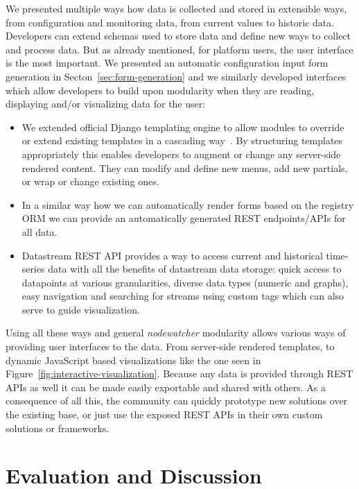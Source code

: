 \documentclass[5p,sort&compress]{elsarticle}
\newcommand{\nodewatcher}{\textit{nodewatcher}}
\begin{document}
We presented multiple ways how data is collected and stored in extensible ways, from configuration and monitoring data, from current values to historic data.
Developers can extend schemas used to store data and define new ways to collect and process data.
But as already mentioned, for platform users, the user interface is the most important.
We presented an automatic configuration input form generation in Secton~\ref{sec:form-generation} and we similarly developed interfaces which allow developers to build upon modularity when they are reading, displaying and/or visualizing data for the user:

\begin{itemize}
\item We extended official Django templating engine to allow modules to override or extend existing templates in a cascading way~\cite{Overextend_2013}.
By structuring templates appropriately this enables developers to augment or change any server-side rendered content.
They can modify and define new menus, add new partials, or wrap or change existing ones.
\item In a similar way how we can automatically render forms based on the registry ORM we can provide an automatically generated REST endpoints/APIs for all data.
\item Datastream REST API provides a way to access current and historical time-series data with all the benefits of datastream data storage: quick access to datapoints at various granularities, diverse data types (numeric and graphs), easy navigation and searching for streams using custom tags which can also serve to guide visualization.
\end{itemize}

Using all these ways and general \nodewatcher{} modularity allows various ways of providing user interfaces to the data.
From server-side rendered templates, to dynamic JavaScript based visualizations like the one seen in Figure~\ref{fig:interactive-visualization}.
Because any data is provided through REST APIs as well it can be made easily exportable and shared with others.
As a consequence of all this, the community can quickly prototype new solutions over the existing base, or just use the exposed REST APIs in their own custom solutions or frameworks.

\section{Evaluation and Discussion}
\label{sec:evaluation}
\end{document}

